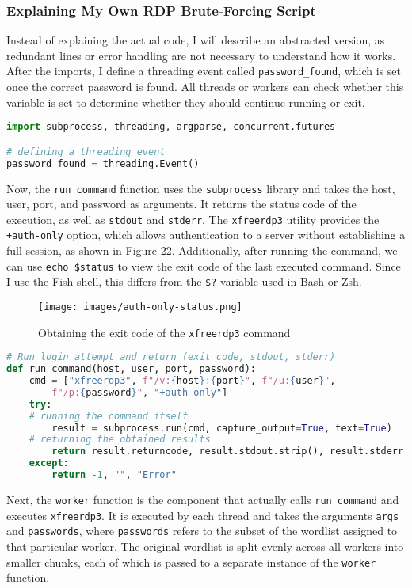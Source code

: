 \documentclass[a4paper]{article}
\newcommand{\abc}{\hfill \break}
\begin{document}
\subsubsection{Explaining My Own RDP Brute-Forcing Script}
Instead of explaining the actual code, I will describe an abstracted version, as redundant lines or error handling are not necessary to understand how it works. \abc
After the imports, I define a threading event called \texttt{password\_found}, which is set once the correct password is found. All threads or workers can check whether this variable is set to determine whether they should continue running or exit.
\begin{lstlisting}[language=python]
import subprocess, threading, argparse, concurrent.futures

# defining a threading event
password_found = threading.Event()
\end{lstlisting}
Now, the \texttt{run\_command} function uses the \texttt{subprocess} library and takes the host, user, port, and password as arguments. It returns the status code of the execution, as well as \texttt{stdout} and \texttt{stderr}. The \texttt{xfreerdp3} utility provides the \texttt{+auth-only} option, which allows authentication to a server without establishing a full session, as shown in Figure 22. Additionally, after running the command, we can use \texttt{echo \$status} to view the exit code of the last executed command. Since I use the Fish shell, this differs from the \texttt{\$?} variable used in Bash or Zsh. \cite{fish-docs-faq}
\begin{figure}[h]
	\texttt{[image: images/auth-only-status.png]}
	\centering
	\caption{Obtaining the exit code of the \texttt{xfreerdp3} command}
\end{figure}\abc
\begin{lstlisting}[language=python]
# Run login attempt and return (exit code, stdout, stderr)
def run_command(host, user, port, password):
    cmd = ["xfreerdp3", f"/v:{host}:{port}", f"/u:{user}",
        f"/p:{password}", "+auth-only"]
    try:
	# running the command itself
        result = subprocess.run(cmd, capture_output=True, text=True)
	# returning the obtained results
        return result.returncode, result.stdout.strip(), result.stderr.strip()
    except:
        return -1, "", "Error"
\end{lstlisting}
Next, the \texttt{worker} function is the component that actually calls \texttt{run\_command} and executes \texttt{xfreerdp3}. It is executed by each thread and takes the arguments \texttt{args} and \texttt{passwords}, where \texttt{passwords} refers to the subset of the wordlist assigned to that particular worker. The original wordlist is split evenly across all workers into smaller chunks, each of which is passed to a separate instance of the \texttt{worker} function. \abc
\end{document}
